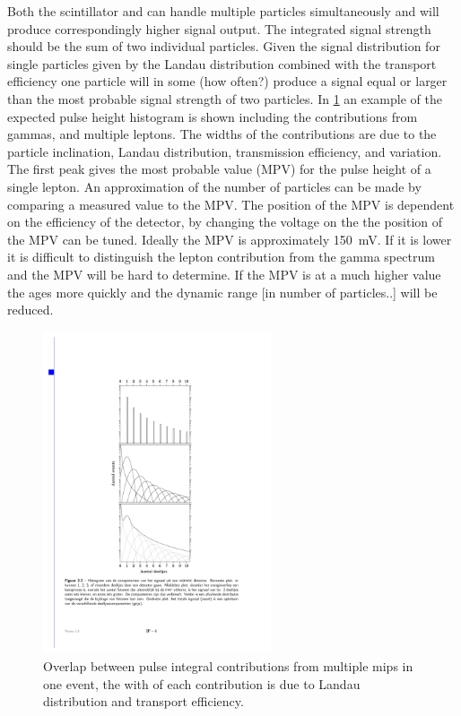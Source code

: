 Both the scintillator and \pmt can handle multiple particles simultaneously and will produce correspondingly higher signal output. The integrated signal strength should be the sum of two individual particles. Given the signal distribution for single particles given by the Landau distribution combined with the transport efficiency one particle will in some (how often?) produce a signal equal or larger than the most probable signal strength of two particles. In \cref{fig:ph_histogram_contrib} an example of the expected pulse height histogram is shown including the contributions from gammas, and multiple leptons. The widths of the contributions are due to the particle inclination, Landau distribution, transmission efficiency, and \pmt variation. The first peak gives the most probable value (MPV) for the pulse height of a single lepton. An approximation of the number of particles can be made by comparing a measured value to the MPV. The position of the MPV is dependent on the efficiency of the detector, by changing the voltage on the \pmt the position of the MPV can be tuned. Ideally the MPV is approximately \SI{150}{\mV}. If it is lower it is difficult to distinguish the lepton contribution from the gamma spectrum and the MPV will be hard to determine. If the MPV is at a much higher value the \pmt ages more quickly and the dynamic range [in number of particles..] will be reduced.

\begin{figure}
    \centering
    \includegraphics[width=0.6\textwidth]
                    {plots/station/ph_histogram_contrib}
    \caption{Overlap between pulse integral contributions from multiple mips in one event, the with of each contribution is due to Landau distribution and transport efficiency.}
    \label{fig:ph_histogram_contrib}
\end{figure}

